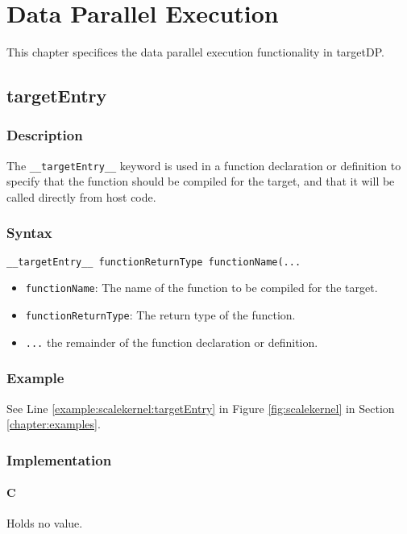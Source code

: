 \chapter{Data Parallel Execution}\label{sec:dpexecution}

This chapter specifices the data parallel execution functionality in targetDP.

\newpage
\section{targetEntry}
\subsection{Description}

The \verb+__targetEntry__+ keyword is used in a function declaration
or definition to specify that the function should be compiled for the
target, and that it will be called directly from host code.

\subsection{Syntax}
\begin{verbatim}
__targetEntry__ functionReturnType functionName(...
\end{verbatim}

\begin{itemize}
\item \verb+functionName+: The name of the function to be compiled for the target.
\item \verb+functionReturnType+: The return type of the function.
\item \verb+...+ the remainder of the function declaration or definition.
\end{itemize}


\subsection{Example}
See Line \ref{example:scalekernel:targetEntry} in Figure \ref{fig:scalekernel} in Section \ref{chapter:examples}.

\subsection{Implementation}
\subsubsection{C}
Holds no value.
